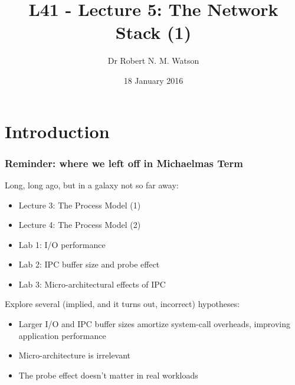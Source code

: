 
{
}

\usepackage[english]{babel}
\usepackage[latin1]{inputenc}
\usepackage{graphicx}
\usepackage{times}
\usepackage[T1]{fontenc}
\usepackage{fancyvrb}
\usepackage{listings}


\def\Tiny{\fontsize{4pt}{4pt} \selectfont}

\title{L41 - Lecture 5: The Network Stack (1)}
\author{Dr Robert N. M. Watson}
\date{18 January 2016}

\begin{frame}
  \titlepage
\end{frame}

\section{Introduction}

\begin{frame}
  \frametitle{Reminder: where we left off in Michaelmas Term}

  Long, long ago, but in a galaxy not so far away:

  \begin{itemize}
    \item Lecture 3: The Process Model (1)
    \item Lecture 4: The Process Model (2)
    \item Lab 1: I/O performance
    \item Lab 2: IPC buffer size and probe effect
    \item Lab 3: Micro-architectural effects of IPC
  \end{itemize}

  \pause
  \medskip

  Explore several (implied, and it turns out, incorrect) hypotheses:

  \begin{itemize}
    \item Larger I/O and IPC buffer sizes amortize system-call overheads,
      improving application performance
    \item Micro-architecture is irrelevant
    \item The probe effect doesn't matter in real workloads
  \end{itemize}
\end{frame}

